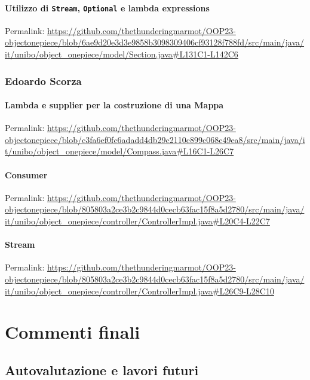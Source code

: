 \documentclass[a4paper,12pt]{report}
\begin{document}
\subsubsection{Utilizzo di \texttt{Stream}, \texttt{Optional} e lambda expressions}

Permalink: \url{https://github.com/thethunderingmarmot/OOP23-objectonepiece/blob/6ae9d20e3d3e9858b3098309406cf93128f788fd/src/main/java/it/unibo/object_onepiece/model/Section.java#L131C1-L142C6}

\subsection*{Edoardo Scorza}
\subsubsection{Lambda e supplier per la costruzione di una Mappa}
Permalink: \url{https://github.com/thethunderingmarmot/OOP23-objectonepiece/blob/c3fa6ef0fc6adadd4db29c2110c899c068c49ea8/src/main/java/it/unibo/object_onepiece/model/Compass.java#L16C1-L26C7}

\subsubsection{Consumer}
Permalink: \url{https://github.com/thethunderingmarmot/OOP23-objectonepiece/blob/805803a2ce3b2c9844d0cecb63fac15f8a5d2780/src/main/java/it/unibo/object_onepiece/controller/ControllerImpl.java#L20C4-L22C7}

\subsubsection{Stream}
Permalink: \url{https://github.com/thethunderingmarmot/OOP23-objectonepiece/blob/805803a2ce3b2c9844d0cecb63fac15f8a5d2780/src/main/java/it/unibo/object_onepiece/controller/ControllerImpl.java#L26C9-L28C10}	


\chapter{Commenti finali}

\section{Autovalutazione e lavori futuri}
\end{document}
